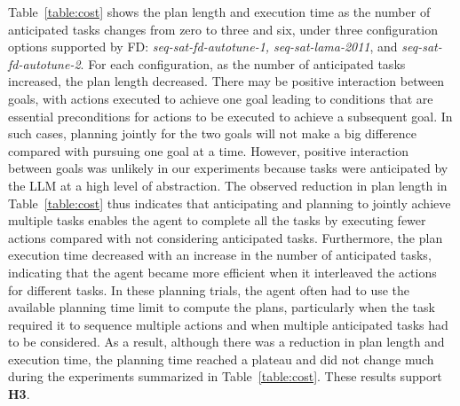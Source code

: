 Table~\ref{table:cost} shows the plan length and execution time as the number of anticipated tasks changes from zero to three and six, under three configuration options supported by FD: \textit{seq-sat-fd-autotune-1, seq-sat-lama-2011}, and \textit{seq-sat-fd-autotune-2}. For each configuration, as the number of anticipated tasks increased, the plan length decreased. There may be positive interaction between goals, with actions executed to achieve one goal leading to conditions that are essential preconditions for actions to be executed to achieve a subsequent goal. In such cases, planning jointly for the two goals will not make a big difference compared with pursuing one goal at a time. However, positive interaction between goals was unlikely in our experiments because tasks were anticipated by the LLM at a high level of abstraction.
The observed reduction in plan length in Table~\ref{table:cost} thus indicates that anticipating and planning to jointly achieve multiple tasks enables the agent to complete all the tasks by executing fewer actions compared with not considering anticipated tasks. Furthermore, the plan execution time decreased with an increase in the number of anticipated tasks, indicating that the agent became more efficient when it interleaved the actions for different tasks. In these planning trials, the agent often had to use the available planning time limit to compute the plans, particularly when the task required it to sequence multiple actions and when multiple anticipated tasks had to be considered. As a result, although there was a reduction in plan length and execution time, the planning time reached a plateau and did not change much during the experiments summarized in Table~\ref{table:cost}. These results support \textbf{H3}.

